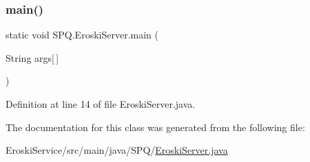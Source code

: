 \subsubsection{\texorpdfstring{main()}{main()}}
{\footnotesize\ttfamily static void S\+P\+Q.\+Eroski\+Server.\+main (\begin{DoxyParamCaption}\item[{String}]{args\mbox{[}$\,$\mbox{]} }\end{DoxyParamCaption})\hspace{0.3cm}{\ttfamily [static]}}



Definition at line 14 of file Eroski\+Server.\+java.



The documentation for this class was generated from the following file\+:\begin{DoxyCompactItemize}
\item 
Eroski\+Service/src/main/java/\+S\+P\+Q/\mbox{\hyperlink{_eroski_server_8java}{Eroski\+Server.\+java}}\end{DoxyCompactItemize}
